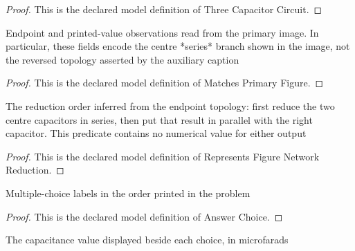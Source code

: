 \begin{proof}
  This is the declared model definition of Three Capacitor Circuit.
\end{proof}
\begin{definition}
  \label{def:physics:phyx-mini-0878:phyxminiproblems-problemphyxmini0878-matchesprimaryfigure}
  Endpoint and printed-value observations read from the primary image. In particular, these fields encode the centre *series* branch shown in the image, not the reversed topology asserted by the auxiliary caption
\end{definition}
\begin{proof}
  This is the declared model definition of Matches Primary Figure.
\end{proof}
\begin{definition}
  \label{def:physics:phyx-mini-0878:phyxminiproblems-problemphyxmini0878-representsfigurenetworkreduction}
  The reduction order inferred from the endpoint topology: first reduce the two centre capacitors in series, then put that result in parallel with the right capacitor. This predicate contains no numerical value for either output
\end{definition}
\begin{proof}
  This is the declared model definition of Represents Figure Network Reduction.
\end{proof}
\begin{definition}
  \label{def:physics:phyx-mini-0878:phyxminiproblems-problemphyxmini0878-answerchoice}
  Multiple-choice labels in the order printed in the problem
\end{definition}
\begin{proof}
  This is the declared model definition of Answer Choice.
\end{proof}
\begin{definition}
  \label{def:physics:phyx-mini-0878:phyxminiproblems-problemphyxmini0878-displayedchoiceinmicrofarads}
  The capacitance value displayed beside each choice, in microfarads
\end{definition}
